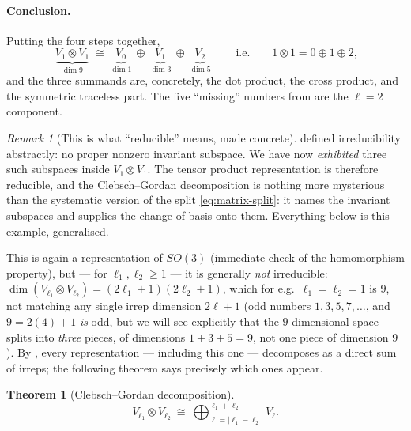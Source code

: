 \documentclass[11pt,a4paper]{report}
\newtheorem{theorem}{Theorem}[chapter]
\theoremstyle{definition}
\theoremstyle{remark}
\newtheorem{remark}[remark]{Remark}
\begin{document}
\paragraph{Conclusion.} Putting the four steps together,
\begin{equation}
\label{eq:one-tensor-one}
\boxed{\;
\underbrace{V_1\otimes V_1}_{\dim 9}
\;\cong\;
\underbrace{V_0}_{\dim 1}\ \oplus\ \underbrace{V_1}_{\dim 3}\ \oplus\ \underbrace{V_2}_{\dim 5}
\;}
\qquad\text{i.e.}\qquad
1\otimes1 = 0\oplus1\oplus2 ,
\end{equation}
and the three summands are, concretely, the dot product, the cross product,
and the symmetric traceless part. The five ``missing'' numbers from
 are the $\ell=2$ component.

\begin{remark}[This is what ``reducible'' means, made concrete]
\label{rem:reducible-concrete}
 defined irreducibility abstractly: no proper
nonzero invariant subspace. We have now \emph{exhibited} three such
subspaces inside $V_1\otimes V_1$. The tensor product representation is
therefore reducible, and the Clebsch--Gordan decomposition is nothing more
mysterious than the systematic version of the split
\eqref{eq:matrix-split}: it names the invariant subspaces and supplies the
change of basis onto them. Everything below is this example, generalised.
\end{remark}

This is again a representation of $SO(3)$ (immediate check of the
homomorphism property), but --- for $\ell_1,\ell_2\ge1$ --- it is generally
\emph{not} irreducible: $\dim(V_{\ell_1}\otimes V_{\ell_2})=(2\ell_1+1)(2\ell_2+1)$,
which for e.g.\ $\ell_1=\ell_2=1$ is $9$, not matching any single irrep
dimension $2\ell+1$ (odd numbers $1,3,5,7,\dots$, and $9=2(4)+1$ \emph{is}
odd, but we will see explicitly that the $9$-dimensional space splits into
\emph{three} pieces, of dimensions $1+3+5=9$, not one piece of dimension $9$).
By , every representation --- including
this one --- decomposes as a direct sum of irreps; the following theorem
says precisely which ones appear.

\begin{theorem}[Clebsch--Gordan decomposition]
\label{thm:cg-decomposition}
\[
V_{\ell_1}\otimes V_{\ell_2}
\ \cong\
\bigoplus_{\ell=|\ell_1-\ell_2|}^{\ell_1+\ell_2} V_\ell .
\]
\end{theorem}
\end{document}
